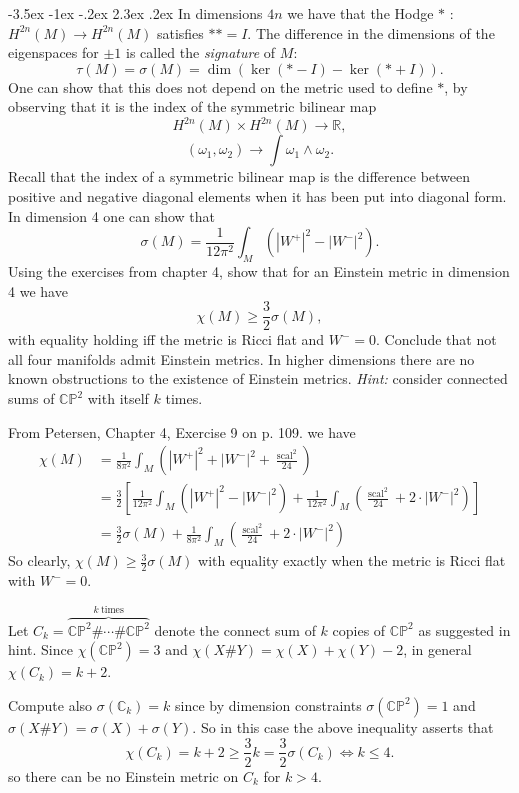 \documentclass[10pt]{article}
\makeatletter
\renewcommand\section{\@startsection{section}{1}{\z@}%
                                  {-3.5ex \@plus -1ex \@minus -.2ex}%
                                  {2.3ex \@plus.2ex}%
                                  {\normalfont\large\bfseries}}
\newcommand{\C}{\ensuremath{\mathbb{C}}}
\newcommand{\CP}{\ensuremath{\mathbb{CP}}}
\newcommand{\R}{\ensuremath{\mathbb{R}}}
\DeclareMathOperator{\scal}{scal}
\DeclareMathOperator{\2}{II}
\newcommand{\hint}[1]{{\emph{Hint:} #1}} %
\newcommand{\pets}[3]{{Petersen, Chapter #1, Exercise #2 on p. #3.}}
\makeatother
\begin{document}

\section{In dimensions $4n$ we have that the Hodge $*$ : $H^{2n}(M) \to H^{2n}(M)$ satisfies $**=I.$ The difference in the dimensions of the eigenspaces for $\pm 1$ is called the \emph{signature} of $M:$ $$\tau(M) = \sigma(M) = \dim( \ker (*-I) - \ker (*+I)).$$ One can show that this does not depend on the metric used to define $*$, by observing that it is the index of the symmetric bilinear map $$H^{2n}(M) \times H^{2n}(M) \to \R, $$ $$(\omega_1, \omega_2) \to \int \omega_1 \wedge \omega_2.$$ Recall that the index of a symmetric bilinear map is the difference between positive and negative diagonal elements when it has been put into diagonal form. In dimension 4 one can show that $$\sigma(M) = \frac{1}{12 \pi^2} \int_M \left(  \left| W^+ \right|^2 - \left| W^- \right|^2 \right).$$ Using the exercises from chapter 4, show that for an Einstein metric in dimension 4 we have $$\chi(M) \geq \frac{3}{2} \sigma(M),$$ with equality holding iff the metric is Ricci flat and $W^-=0.$ Conclude that not all four manifolds admit Einstein metrics. In higher dimensions there are no known obstructions to the existence of Einstein metrics. \hint{consider connected sums of $\CP^2$ with itself $k$ times.}}

From \pets{4}{9}{109} we have
\begin{align*}
\chi(M) &= \frac{1}{8 \pi^2} \int_M \left( |W^+|^2 + |W^-|^2 + \frac{\scal^2}{24} \right)\\
&=  \frac{3}{2} \left[ \frac{1}{12 \pi^2} \int_M \left( |W^+|^2 - |W^-|^2 \right)+ \frac{1}{12 \pi^2} \int_M \left(  \frac{\scal^2}{24} + 2 \cdot |W^-|^2 \right) \right] \\
&=  \frac{3}{2}  \sigma(M) + \frac{1}{8 \pi^2} \int_M \left(  \frac{\scal^2}{24} + 2 \cdot |W^-|^2 \right)   
\end{align*}
So clearly, $\chi(M) \geq \frac{3}{2}\sigma(M)$ with equality exactly when the metric is Ricci flat with  $W^- =0$.

Let $C_k = \overbrace{\CP^2 \# \cdots \# \CP^2}^{k\ \mathrm{times}}$ denote the connect sum of $k$ copies of $\CP^2$ as suggested in hint. Since $\chi(\CP^2) = 3$ and $\chi( X \# Y) = \chi(X) + \chi(Y) -2 $, in general $\chi(C_k) = k+2$.

Compute also $\sigma(\C_k) = k$ since by dimension constraints $\sigma(\CP^2) = 1$ and $\sigma(X \# Y) = \sigma(X) + \sigma(Y)$. So in this case the above inequality asserts that
\[\chi(C_k) = k+2 \geq \frac{3}{2} k = \frac{3}{2} \sigma(C_k) \iff k \leq 4.\]
so there can be no Einstein metric on $C_k$ for $k > 4$.
\end{document}

